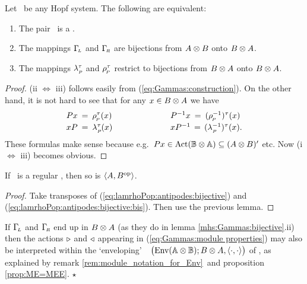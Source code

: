 \begin{lemma_sec}  \label{mhs:Gammas:bijective}
Let\/ \pairAB\ be any Hopf system. The following are equivalent:
\begin{enumerate}
\item The pair\/ \pairAB\ is a \mhs.
\item The mappings\/ $\Gamma_{\!\scriptscriptstyle L}$ and\/ $\Gamma_{\!\scriptscriptstyle R}$ are bijections from\/ $A\otimes B$ onto\/ $B \otimes A$.
\item The mappings\/ $\lambda_{_P\!}^\tau$ and\/ $\rho_{_{\!P}}^\tau$ restrict to bijections
      from\/ $B\otimes A$  onto\/ $B \otimes A$.
\end{enumerate}
\end{lemma_sec}
\begin{proof}
(ii $\Leftrightarrow$ iii) follows easily from (\ref{eq:Gammas:construction}).
On the other hand, it is not hard to see that for any $x \in B\otimes A$ we have
$$ \begin{array}{lcl}
   Px  \:=\:  \rp^\tau(x)   & \hspace{5em} &  P^{-1} x  \:=\:  (\rp^{-1})^\tau(x) \\
   xP  \:=\:  \lp^\tau(x)   & \vertL &  x P^{-1}  \,=\, (\lp^{-1})^\tau(x).
   \end{array} $$
These formulas make sense because e.g.\ $Px \in \mbox{\rm Act}(\mathbb{B} \otimes \mathbb{A}) \subseteq (A \otimes B)'$ etc.
Now (i $\Leftrightarrow$ iii) becomes obvious.
\end{proof}


\begin{lemma_sec} \label{Mregularity_is_automatic}
If \pairAB\ is a regular \mhs, then so is $\langle A,B^{\rm op} \rangle$.
\end{lemma_sec}
\begin{proof}
Take transposes of (\ref{eq:lamrhoPop:antipodes:bijective})
and (\ref{eq:lamrhoPop:antipodes:bijective:bis}).
Then use the previous lemma.
\end{proof}



\begin{remark_sec} \rm
If $\Gamma_{\!\scriptscriptstyle L}$ and $\Gamma_{\!\scriptscriptstyle R}$ end up in $B \otimes A$
(as they do in lemma \ref{mhs:Gammas:bijective}.ii)
then the actions $\triangleright$ and $\triangleleft$ appearing in (\ref{eq:Gammas:module properties})
may also be interpreted within the
\lq enveloping\rq\ \context\ $\left(\Env(\AABB); B\tens A, \pairing \vertM\right)$
of \AABB, as explained by remark \ref{rem:module_notation_for_Env}\ and proposition \ref{prop:ME=MEE}.
\hfill $\star$
\end{remark_sec}




